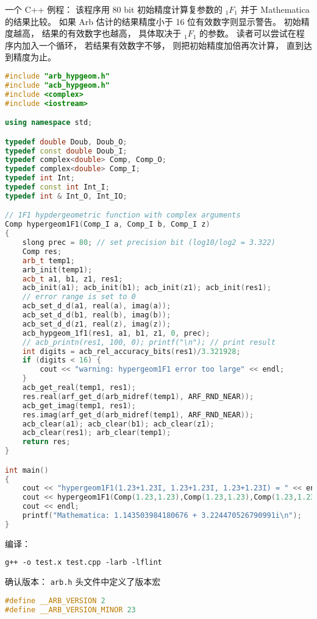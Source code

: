 一个 C++ 例程： 该程序用 80 bit 初始精度计算复参数的 $_1F_1$ 并于 Mathematica 的结果比较。 如果 Arb 估计的结果精度小于 16 位有效数字则显示警告。 初始精度越高， 结果的有效数字也越高， 具体取决于 $_1F_1$ 的参数。 读者可以尝试在程序内加入一个循环， 若结果有效数字不够， 则把初始精度加倍再次计算， 直到达到精度为止。

\begin{lstlisting}[language=cpp, caption=test.cpp]
#include "arb_hypgeom.h"
#include "acb_hypgeom.h"
#include <complex>
#include <iostream>

using namespace std;

typedef double Doub, Doub_O;
typedef const double Doub_I;
typedef complex<double> Comp, Comp_O;
typedef complex<double> Comp_I;
typedef int Int;
typedef const int Int_I;
typedef int & Int_O, Int_IO;

// 1F1 hypdergeometric function with complex arguments
Comp hypergeom1F1(Comp_I a, Comp_I b, Comp_I z)
{
	slong prec = 80; // set precision bit (log10/log2 = 3.322)
	Comp res;
	arb_t temp1;
	arb_init(temp1);
	acb_t a1, b1, z1, res1;
	acb_init(a1); acb_init(b1); acb_init(z1); acb_init(res1);
	// error range is set to 0
	acb_set_d_d(a1, real(a), imag(a));
	acb_set_d_d(b1, real(b), imag(b));
	acb_set_d_d(z1, real(z), imag(z));
	acb_hypgeom_1f1(res1, a1, b1, z1, 0, prec);
	// acb_printn(res1, 100, 0); printf("\n"); // print result
	int digits = acb_rel_accuracy_bits(res1)/3.321928;
	if (digits < 16) {
		cout << "warning: hypergeom1F1 error too large" << endl;
	}
	acb_get_real(temp1, res1);
	res.real(arf_get_d(arb_midref(temp1), ARF_RND_NEAR));
	acb_get_imag(temp1, res1);
	res.imag(arf_get_d(arb_midref(temp1), ARF_RND_NEAR));
	acb_clear(a1); acb_clear(b1); acb_clear(z1);
    acb_clear(res1); arb_clear(temp1);
	return res;
}

int main()
{
	cout << "hypergeom1F1(1.23+1.23I, 1.23+1.23I, 1.23+1.23I) = " << endl;
	cout << hypergeom1F1(Comp(1.23,1.23),Comp(1.23,1.23),Comp(1.23,1.23))
    cout << endl;
	printf("Mathematica: 1.143503984180676 + 3.224470526790991i\n");
}
\end{lstlisting}
编译：
\begin{lstlisting}[language=makefile]
g++ -o test.x test.cpp -larb -lflint
\end{lstlisting}

确认版本： \verb|arb.h| 头文件中定义了版本宏
\begin{lstlisting}[language=cpp]
#define __ARB_VERSION 2
#define __ARB_VERSION_MINOR 23
\end{lstlisting}

